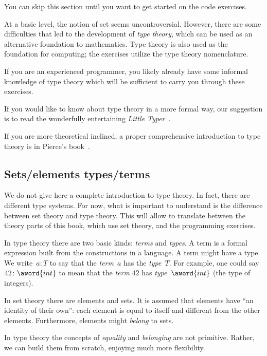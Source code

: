 
\begin{remark}
    You can skip this section until you want to get started on the code exercises.
\end{remark}

At a basic level, the notion of set seems uncontroversial.
However, there are some difficulties that led to the development of \emph{type theory},
which can be used as an alternative foundation to mathematics.
Type theory is also used as the foundation for computing; the exercises utilize the type theory nomenclature.

If you are an experienced programmer, you likely already have some informal knowledge of type theory which will be sufficient to carry you through these exercises.

If you would like to know about type theory in a more formal way, our suggestion is to read the wonderfully entertaining \emph{Little Typer}~\cite{friedman2018little}.

If you are more theoretical inclined, a proper comprehensive introduction to type theory is in Pierce's book~\cite{pierce02types}.

\subsection{Sets/elements \vs types/terms}
We do not give here a complete introduction to type theory.
In fact, there are different type systems.
For now, what is important to understand is the difference between set theory and type theory.
This will allow to translate between the theory parts of this book, which use set theory, and the programming exercises.

In type theory there are two basic kinds: \emph{terms} and \emph{types}.
A term is a formal expression built from the constructions in a language.
A term might have a type.
We write~$a \colon T$ to say that the \emph{term}~$a$ has the \emph{type}~$T$.
For example, one could say~$42 \colon \aword{int}$ to mean that the \emph{term}  $42$ has \emph{type}~$\aword{int}$ (the type of integers).

In set theory there are elements and sets.
It is assumed that elements have ``an identity of their own'': each element is equal to itself and different from the other elements.
Furthermore, elements might \emph{belong} to sets.

In type theory the concepts of \emph{equality} and \emph{belonging} are not primitive.
Rather, we can build them from scratch, enjoying much more flexibility.

